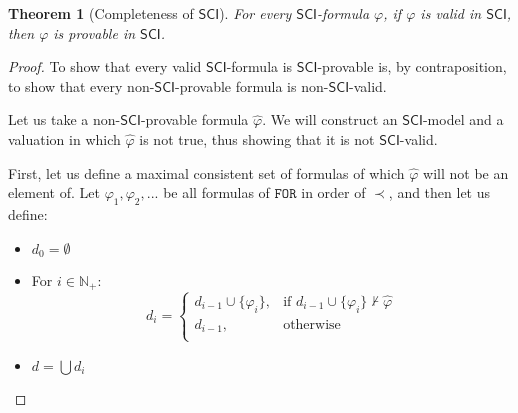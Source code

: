 \documentclass{article}
\newtheorem{theorem}{Theorem}
\theoremstyle{definition}
\theoremstyle{definition}
\theoremstyle{definition}
\newcommand*{\FOR}{\texttt{FOR}}
\newcommand{\SCI}{$\mathsf{SCI}$\xspace}
\newcommand{\N}{\mathbb{N}}
\begin{document}
\begin{theorem}[Completeness of \SCI]
    For every \SCI-formula $\varphi$, if $\varphi$ is valid in \SCI, then $\varphi$ is provable in \SCI.
\end{theorem}
\begin{proof}
    To show that every valid \SCI-formula is \SCI-provable is, by contraposition, to show that every non-\SCI-provable formula is non-\SCI-valid.

    Let us take a non-\SCI-provable formula $\hat{\varphi}$. We will construct an
    \SCI-model and a valuation in which $\hat{\varphi}$ is not true, thus showing
    that it is not \SCI-valid.

    First, let us define a maximal consistent set of formulas of which
    $\hat{\varphi}$ will not be an element of. Let $\varphi_1, \varphi_2, ...$ be
    all formulas of $\FOR$ in order of $\prec$, and then let us define:

    \begin{itemize}
        \item $d_0 = \emptyset$
        \item For $i \in \N_+$: $$ d_{i} = \begin{cases}
                      d_{i-1} \cup \{\varphi_i\}, & \text{if } d_{i-1} \cup \{\varphi_i\} \not \vdash \hat{\varphi} \\
                      d_{i-1},                    & \text{otherwise}                                                \\
                  \end{cases}
              $$
        \item $d = \bigcup d_i$
    \end{itemize}


\end{proof}
\end{document}
